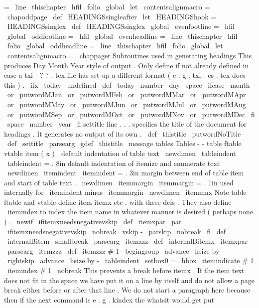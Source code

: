 {{=
{
\
line
{
\
thischapter
\
hfil
\
folio
}
}
\
global
\
let
\
contentsalignmacro
=
\
chapoddpage
}
\
def
\
HEADINGSsingleafter
{
\
let
\
HEADINGShook
=
\
HEADINGSsinglex
}
\
def
\
HEADINGSsinglex
{
%
\
global
\
evenfootline
=
{
\
hfil
}
\
global
\
oddfootline
=
{
\
hfil
}
\
global
\
evenheadline
=
{
\
line
{
\
thischapter
\
hfil
\
folio
}
}
\
global
\
oddheadline
=
{
\
line
{
\
thischapter
\
hfil
\
folio
}
}
\
global
\
let
\
contentsalignmacro
=
\
chappager
}
%
Subroutines
used
in
generating
headings
%
This
produces
Day
Month
Year
style
of
output
.
%
Only
define
if
not
already
defined
in
case
a
txi
-
?
?
.
tex
file
has
set
%
up
a
different
format
(
e
.
g
.
txi
-
cs
.
tex
does
this
)
.
\
ifx
\
today
\
undefined
\
def
\
today
{
%
\
number
\
day
\
space
\
ifcase
\
month
\
or
\
putwordMJan
\
or
\
putwordMFeb
\
or
\
putwordMMar
\
or
\
putwordMApr
\
or
\
putwordMMay
\
or
\
putwordMJun
\
or
\
putwordMJul
\
or
\
putwordMAug
\
or
\
putwordMSep
\
or
\
putwordMOct
\
or
\
putwordMNov
\
or
\
putwordMDec
\
fi
\
space
\
number
\
year
}
\
fi
%
settitle
line
.
.
.
specifies
the
title
of
the
document
for
headings
.
%
It
generates
no
output
of
its
own
.
\
def
\
thistitle
{
\
putwordNoTitle
}
\
def
\
settitle
{
\
parsearg
{
\
gdef
\
thistitle
}
}
\
message
{
tables
}
%
Tables
-
-
table
ftable
vtable
item
(
x
)
.
%
default
indentation
of
table
text
\
newdimen
\
tableindent
\
tableindent
=
.
8in
%
default
indentation
of
itemize
and
enumerate
text
\
newdimen
\
itemindent
\
itemindent
=
.
3in
%
margin
between
end
of
table
item
and
start
of
table
text
.
\
newdimen
\
itemmargin
\
itemmargin
=
.
1in
%
used
internally
for
\
itemindent
minus
\
itemmargin
\
newdimen
\
itemmax
%
Note
table
ftable
and
vtable
define
item
itemx
etc
.
with
%
these
defs
.
%
They
also
define
\
itemindex
%
to
index
the
item
name
in
whatever
manner
is
desired
(
perhaps
none
)
.
\
newif
\
ifitemxneedsnegativevskip
\
def
\
itemxpar
{
\
par
\
ifitemxneedsnegativevskip
\
nobreak
\
vskip
-
\
parskip
\
nobreak
\
fi
}
\
def
\
internalBitem
{
\
smallbreak
\
parsearg
\
itemzzz
}
\
def
\
internalBitemx
{
\
itemxpar
\
parsearg
\
itemzzz
}
\
def
\
itemzzz
#
1
{
\
begingroup
%
\
advance
\
hsize
by
-
\
rightskip
\
advance
\
hsize
by
-
\
tableindent
\
setbox0
=
\
hbox
{
\
itemindicate
{
#
1
}
}
%
\
itemindex
{
#
1
}
%
\
nobreak
%
This
prevents
a
break
before
itemx
.
%
%
If
the
item
text
does
not
fit
in
the
space
we
have
put
it
on
a
line
%
by
itself
and
do
not
allow
a
page
break
either
before
or
after
that
%
line
.
We
do
not
start
a
paragraph
here
because
then
if
the
next
%
command
is
e
.
g
.
kindex
the
whatsit
would
get
put
}}
